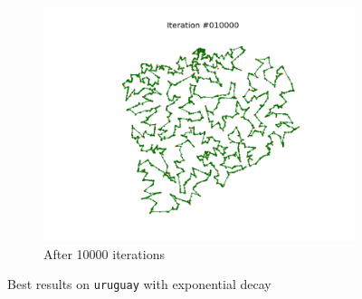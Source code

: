 \documentclass[11pt]{article}
\begin{document}
\begin{figure}
\begin{subfigure}{.33\textwidth}
  \includegraphics[trim={4cm 2cm 4cm 2cm}, clip=true,width=\linewidth]{u_10000.png}
  \caption{After 10000 iterations}
\end{subfigure}
\caption{Best results on \texttt{uruguay} with exponential decay}
\label{fig:buruguay}
\end{figure}
\end{document}
